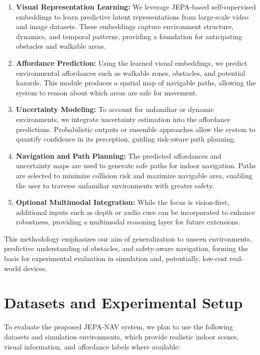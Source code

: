 \documentclass{article}
\begin{document}
\begin{enumerate}
    \item \textbf{Visual Representation Learning:} We leverage JEPA-based self-supervised embeddings to learn predictive latent representations from large-scale video and image datasets. These embeddings capture environment structure, dynamics, and temporal patterns, providing a foundation for anticipating obstacles and walkable areas.

    \item \textbf{Affordance Prediction:} Using the learned visual embeddings, we predict environmental affordances such as walkable zones, obstacles, and potential hazards. This module produces a spatial map of navigable paths, allowing the system to reason about which areas are safe for movement.

    \item \textbf{Uncertainty Modeling:} To account for unfamiliar or dynamic environments, we integrate uncertainty estimation into the affordance predictions. Probabilistic outputs or ensemble approaches allow the system to quantify confidence in its perception, guiding risk-aware path planning.

    \item \textbf{Navigation and Path Planning:} The predicted affordances and uncertainty maps are used to generate safe paths for indoor navigation. Paths are selected to minimize collision risk and maximize navigable area, enabling the user to traverse unfamiliar environments with greater safety.

    \item \textbf{Optional Multimodal Integration:} While the focus is vision-first, additional inputs such as depth or audio cues can be incorporated to enhance robustness, providing a multimodal reasoning layer for future extensions.
\end{enumerate}

This methodology emphasizes our aim of generalization to unseen environments, predictive understanding of obstacles, and safety-aware navigation, forming the basis for experimental evaluation in simulation and, potentially, low-cost real-world devices.

\section{Datasets and Experimental Setup}

To evaluate the proposed JEPA‑NAV system, we plan to use the following datasets and simulation environments, which provide realistic indoor scenes, visual information, and affordance labels where available:
\end{document}
